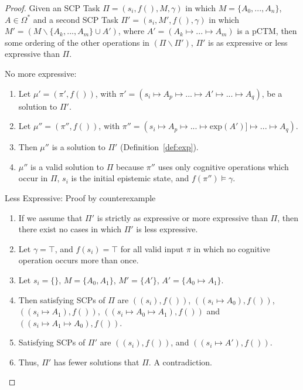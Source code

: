 \begin{proof} \label{proof:aggregateExpressiveness}
Given an SCP Task $\Pi=(s_i,f(), M, \gamma)$ in which $M=\{A_0,...,A_n\}$, $A\in\Omega^*$ and a second SCP Task $\Pi'=(s_i,M',f(),\gamma)$ in which $M'= (M \smallsetminus \{A_k,...,A_m\} \cup A')$, where $A'=(A_k \longmapsto... \longmapsto A_m)$ is a pCTM, then some ordering of the other operations in $(\Pi \smallsetminus \Pi')$, $\Pi'$ is as expressive or less expressive than $\Pi$.

\item No more expressive:
\begin{enumerate}
\item Let $\mu'=(\pi',f())$, with $\pi' = (s_i\longmapsto A_p \longmapsto ... \longmapsto A' \longmapsto ... \longmapsto A_q)$, be a solution to $\Pi'$.
\item Let $\mu''=(\pi'',f())$, with $\pi'' = (s_i\longmapsto A_p \longmapsto ... \longmapsto \text{exp}(A')] \longmapsto ... \longmapsto A_q)$.
\item Then $\mu''$ is a solution to $\Pi'$ (Definition~\ref{def:exp}).
\item $\mu''$ is a valid solution to $\Pi$ because $\pi''$ uses only cognitive operations which occur in $\Pi$, $s_i$ is the initial epistemic state, and $f(\pi'') \models \gamma$. 
\end{enumerate}
\item Less Expressive: Proof by counterexample
\begin{enumerate}
\item If we assume that $\Pi'$ is strictly as expressive or more expressive than $\Pi$, then there exist no cases in which $\Pi'$ is less expressive.
\item Let $\gamma = \top$, and $f(s_i)=\top$ for all valid input $\pi$ in which no cognitive operation occurs more than once.
\item Let $s_i=\{\}$, $M=\{A_0,A_1\}$, $M'=\{A'\}$, $A'=\{A_0\longmapsto A_1\}$.
\item Then satisfying SCPs of $\Pi$ are $((s_i),f())$, $((s_i \longmapsto A_0),f())$, $((s_i \longmapsto A_1),f())$, $((s_i \longmapsto A_0\longmapsto A_1),f())$ and $((s_i \longmapsto A_1\longmapsto A_0),f())$.
\item Satisfying SCPs of $\Pi'$ are $((s_i),f())$, and $((s_i \longmapsto A'),f())$.
\item Thus, $\Pi'$ has fewer solutions that $\Pi$. A contradiction.
\end{enumerate}
\end{proof}


